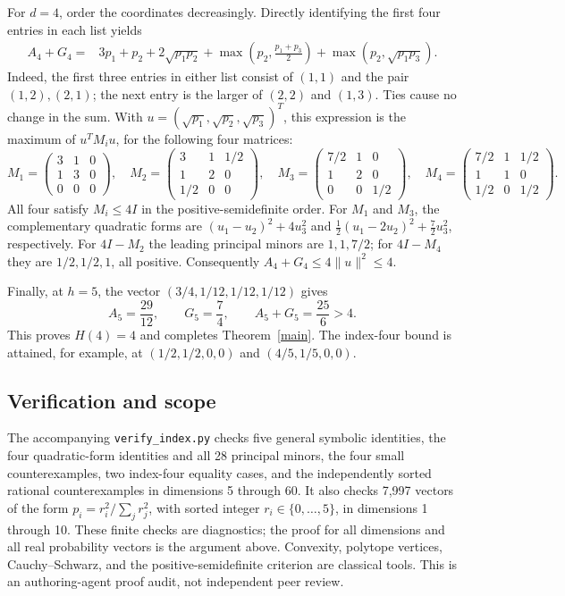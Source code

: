 \documentclass[11pt]{article}
\begin{document}
For $d=4$, order the coordinates decreasingly. Directly identifying
the first four entries in each list yields
\begin{align*}
 A_4+G_4={}&3p_1+p_2+2\sqrt{p_1p_2}
 +\max\left(p_2,\frac{p_1+p_3}{2}\right)
 +\max\left(p_2,\sqrt{p_1p_3}\right).
\end{align*}
Indeed, the first three entries in either list consist of $(1,1)$
and the pair $(1,2),(2,1)$; the next entry is the larger of
$(2,2)$ and $(1,3)$. Ties cause no change in the sum.
With $u=(\sqrt{p_1},\sqrt{p_2},\sqrt{p_3})^T$, this expression
is the maximum of $u^TM_i u$, for the following four matrices:
\[
 M_1=\begin{pmatrix}3&1&0\\1&3&0\\0&0&0\end{pmatrix},\quad
 M_2=\begin{pmatrix}3&1&1/2\\1&2&0\\1/2&0&0\end{pmatrix},\quad
 M_3=\begin{pmatrix}7/2&1&0\\1&2&0\\0&0&1/2\end{pmatrix},\quad
 M_4=\begin{pmatrix}7/2&1&1/2\\1&1&0\\1/2&0&1/2\end{pmatrix}.
\]
All four satisfy $M_i\le4I$ in the positive-semidefinite order.
For $M_1$ and $M_3$, the complementary quadratic forms are
$(u_1-u_2)^2+4u_3^2$ and
$\tfrac12(u_1-2u_2)^2+\tfrac72u_3^2$, respectively.
For $4I-M_2$ the leading principal minors are $1,1,7/2$;
for $4I-M_4$ they are $1/2,1/2,1$, all positive.
Consequently $A_4+G_4\le4\|u\|^2\le4$.

Finally, at $h=5$, the vector $(3/4,1/12,1/12,1/12)$ gives
\[
 A_5=\frac{29}{12},\qquad G_5=\frac74,\qquad
 A_5+G_5=\frac{25}{6}>4.
\]
This proves $H(4)=4$ and completes Theorem~\ref{main}.
The index-four bound is attained, for example, at
$(1/2,1/2,0,0)$ and $(4/5,1/5,0,0)$.

\subsection*{Verification and scope}
The accompanying \texttt{verify\_index.py} checks five general
symbolic identities, the four quadratic-form identities and all
28 principal minors, the four small counterexamples, two
index-four equality cases, and the independently sorted rational
counterexamples in dimensions 5 through 60. It also checks 7,997
vectors of the form $p_i=r_i^2/\sum_jr_j^2$, with sorted integer
$r_i\in\{0,\ldots,5\}$, in dimensions 1 through 10.
These finite checks are diagnostics; the proof for all dimensions
and all real probability vectors is the argument above.
Convexity, polytope vertices, Cauchy--Schwarz, and the
positive-semidefinite criterion are classical tools.
This is an authoring-agent proof audit, not independent peer review.
\end{document}
